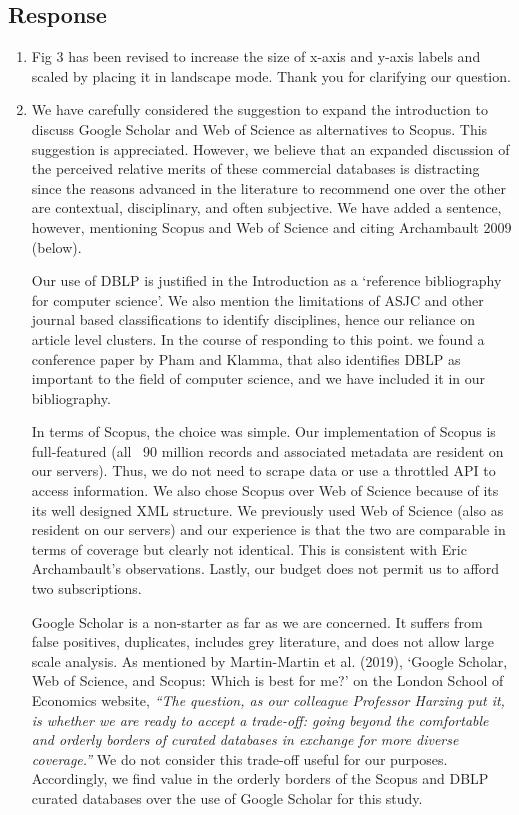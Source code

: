 \documentclass[11pt, oneside]{article}   	%
\begin{document}
\subsection*{Response}
\begin{enumerate}
\item Fig 3 has been revised to increase the size of x-axis and y-axis labels and scaled by placing it in landscape mode. Thank you for clarifying our question.
\item We have carefully considered the suggestion to expand the introduction to discuss Google Scholar and Web of Science as alternatives to Scopus. This suggestion is appreciated. 
However, we believe that an expanded discussion of the perceived relative merits of these commercial databases is distracting since the reasons advanced in the literature to recommend one 
over the other are contextual, disciplinary, and often subjective. We have added a sentence, however, mentioning Scopus and Web of Science and citing Archambault 2009 (below).

Our use of DBLP is justified in the Introduction as a `reference bibliography for computer science'. We also mention the limitations of ASJC and other journal based classifications to identify 
disciplines, hence our reliance on article level clusters. In the course of responding to this point. we found a conference paper by Pham and Klamma, that also identifies DBLP as important 
to the field of computer science, and we have included it in our bibliography.

In terms of Scopus, the choice was simple. Our implementation of Scopus is full-featured (all ~90 million records and associated metadata are resident on our servers). Thus, we do not need to scrape 
data or use a throttled API to access information. We also chose Scopus over Web of Science because of its its well designed XML structure. We previously used Web of Science (also as resident on 
our servers) and our experience is that the two are comparable in terms of coverage but clearly not identical. This is consistent with Eric Archambault's observations.  Lastly, our budget does not permit us to afford two subscriptions. 

Google Scholar is a non-starter as far as we are concerned. It suffers from false positives, duplicates, includes grey literature, and does not allow large scale analysis. As mentioned by Martin-Martin et al. (2019),
`Google Scholar, Web of Science, and Scopus: Which is best for me?' on the London School of Economics website, \emph{``The question, as our colleague Professor Harzing put it, is whether 
we are ready to accept a trade-off: going beyond the comfortable and orderly borders of curated databases in exchange for more diverse coverage.''} We do not consider this trade-off useful for 
our purposes. Accordingly, we find value in the orderly borders of the Scopus and DBLP curated databases over the use of Google Scholar for this study.


\end{enumerate}
\end{document}

